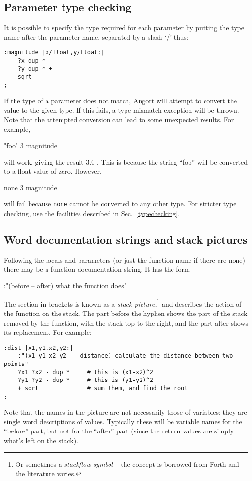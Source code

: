 \subsection{Parameter type checking}
It is possible to specify the type required for each parameter by putting the type name
after the parameter name, separated by a slash `/' thus:
\begin{lstlisting}
:magnitude |x/float,y/float:|
    ?x dup *
    ?y dup * +
    sqrt
;
\end{lstlisting}
If the type of a parameter does not match, Angort will attempt to convert the 
value to the given type. If this fails, a type mismatch exception will be thrown.
Note that the attempted conversion can lead to some unexpected results. For example,
\begin{v}
"foo" 3 magnitude
\end{v}
will work, giving the result 3.0 . This is because the string ``foo'' will be converted
to a float value of zero. However,
\begin{v}
none 3 magnitude
\end{v}
will fail because \texttt{none} cannot be converted to any other type.
For stricter type checking, use the facilities described in
Sec.~\ref{typechecking}.

\subsection{Word documentation strings and stack pictures}
\label{stackpic}
Following the locals and parameters (or just the function name if there
are none) there may be a function documentation string. It has the form
\begin{v}
:"(before -- after) what the function does"
\end{v}
The section in brackets is known as a \emph{stack picture,}\footnote{Or sometimes
a \emph{stackflow symbol} -- the concept is borrowed from Forth and the literature
varies.} and describes
the action of the function on the stack. The part before the hyphen
shows the part of the stack removed by the function, with
the stack top to the right, and the part after
shows its replacement. For example:
\begin{lstlisting}
:dist |x1,y1,x2,y2:|
    :"(x1 y1 x2 y2 -- distance) calculate the distance between two points"
    ?x1 ?x2 - dup *     # this is (x1-x2)^2
    ?y1 ?y2 - dup *     # this is (y1-y2)^2
    + sqrt              # sum them, and find the root
;
\end{lstlisting}
Note that the names in the picture are not necessarily those of variables:
they are single word descriptions of values. Typically these will be variable
names for the ``before'' part, but not for the ``after'' part (since
the return values are simply what's left on the stack).

